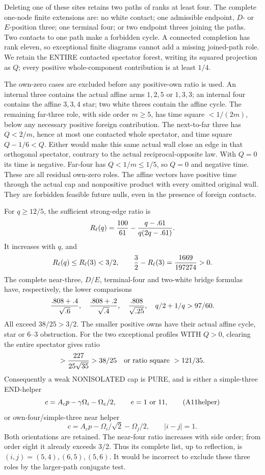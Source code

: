\documentclass[11pt]{article}
\begin{document}
Deleting one of these sites retains two paths
of ranks at least four.
The complete one-node finite extensions are:
no white contact; one admissible endpoint,
\(D\)- or \(E\)-position three; one terminal
four; or two endpoint threes joining the paths.
Two contacts to one path make a forbidden
cycle.  A connected completion has rank eleven,
so exceptional finite diagrams cannot add a
missing joined-path role.
We retain the ENTIRE contacted spectator forest,
writing its squared projection as \(Q\);
every positive whole-component contribution
is at least \(1/4\).

The own-zero cases are excluded before any
positive-own ratio is used.
An internal three contains the actual affine
arms \(1,2,5\) or \(1,3,3\); an internal four
contains the affine \(3,3,4\) star; two
white threes contain the affine cycle.
The remaining far-three role, with side
order \(m\ge5\), has time square
\(<1/(2m)\), below any necessary positive
foreign contribution.
The next-to-far three has \(Q<2/m\), hence
at most one contacted whole spectator, and
time square \(Q-1/6<Q\).
Either would make this same actual wall
close an edge in that orthogonal spectator,
contrary to the actual reciprocal-opposite
law.  With \(Q=0\) its time is negative.
Far-four has \(Q<1/m\le1/5\), so \(Q=0\)
and negative time.
These are all residual own-zero roles.
The affine vectors have positive time through
the actual cap and nonpositive product with
every omitted original wall.
They are forbidden feasible future nulls,
even in the presence of foreign contacts.

For \(q\ge12/5\), the sufficient strong-edge
ratio is
\[
 R_\ell(q)={100\over61}
              -{q-.61\over q(2q-.61)}.
\]
It increases with \(q\), and
\[
 R_\ell(q)\le R_\ell(3)<3/2,\qquad
 {3\over2}-R_\ell(3)={1669\over197274}>0.
\]
The complete near-three, \(D/E\), terminal-four
and two-white bridge formulas have, respectively,
the lower comparisons
\[
 { .808+.4\over\sqrt{.6}},\quad
 { .808+.2\over\sqrt{.4}},\quad
 { .808\over\sqrt{.25}},\quad
 q/2+1/q>97/60 .
\]
All exceed \(38/25>3/2\).
The smaller positive owns have their actual
affine cycle, star or \(6\)--\(3\) obstruction.
For the two exceptional profiles WITH \(Q>0\),
clearing the entire spectator gives ratio
\[
 >{227\over25\sqrt{35}}>38/25
       \quad\hbox{or ratio square }>121/35.
\]
Consequently a weak NONISOLATED cap is PURE,
and is either a simple-three END-helper
\[
 c=A_cp-\gamma\Omega_i-\Omega_e/2,\qquad
 e=1\ \hbox{or }11,
\tag{A11helper}\label{eq:arithA11helper}
\]
or own-four/simple-three near helper
\[
 c=A_cp-\Omega_i/\sqrt2-\Omega_j/2,\qquad |i-j|=1.
\tag{A11near4}\label{eq:arithA11near4}
\]
Both orientations are retained.
The near-four ratio increases with side order;
from order eight it already exceeds \(3/2\).
Thus its complete list, up to reflection, is
\((i,j)=(5,4),(6,5),(5,6)\).
It would be incorrect to exclude these three
roles by the larger-path conjugate test.
\end{document}
